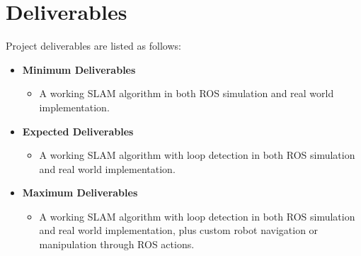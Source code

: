 \documentclass[11pt]{article} \usepackage[top=1in, bottom=1in, left=1in, right=1in]{geometry}
\begin{document}
\section{Deliverables}
Project deliverables are listed as follows:
\begin{itemize}
    \item \textbf{Minimum Deliverables}
    \begin{itemize}
        \item A working SLAM algorithm in both ROS simulation and real world implementation.
    \end{itemize}
    \item \textbf{Expected Deliverables}
    \begin{itemize}
        \item A working SLAM algorithm with loop detection in both ROS simulation and real world implementation.
    \end{itemize}
    \item \textbf{Maximum Deliverables}
    \begin{itemize}
        \item A working SLAM algorithm with loop detection in both ROS simulation and real world implementation, plus custom robot navigation or manipulation through ROS actions.
    \end{itemize}
\end{itemize}
\end{document}
